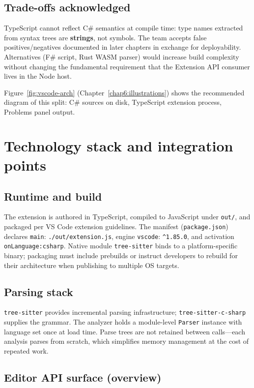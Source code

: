 \subsection{Trade-offs acknowledged}

TypeScript cannot reflect C\# semantics at compile time: type names extracted from syntax trees are \textbf{strings}, not symbols. The team accepts false positives/negatives documented in later chapters in exchange for deployability. Alternatives (F\# script, Rust WASM parser) would increase build complexity without changing the fundamental requirement that the Extension API consumer lives in the Node host.

Figure~\ref{fig:vscode-arch} (Chapter~\ref{chap6:illustrations}) shows the recommended diagram of this split: C\# sources on disk, TypeScript extension process, Problems panel output.

\section{Technology stack and integration points}
\label{chap2:tech}

\subsection{Runtime and build}

The extension is authored in TypeScript, compiled to JavaScript under \texttt{out/}, and packaged per VS Code extension guidelines. The manifest (\texttt{package.json}) declares \texttt{main}: \texttt{./out/extension.js}, engine \texttt{vscode}: \texttt{^1.85.0}, and activation \texttt{onLanguage:csharp}. Native module \texttt{tree-sitter} binds to a platform-specific binary; packaging must include prebuilds or instruct developers to rebuild for their architecture when publishing to multiple OS targets.

\subsection{Parsing stack}

\texttt{tree-sitter} provides incremental parsing infrastructure; \texttt{tree-sitter-c-sharp} supplies the grammar. The analyzer holds a module-level \texttt{Parser} instance with language set once at load time. Parse trees are not retained between calls---each analysis parses from scratch, which simplifies memory management at the cost of repeated work.

\subsection{Editor API surface (overview)}

